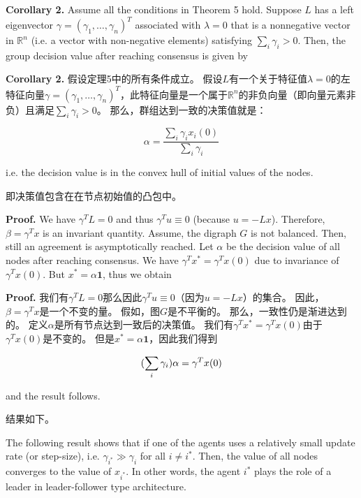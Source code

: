 \documentclass{article}
\begin{document}
{\color[gray]{0.5}
\noindent \textbf{Corollary 2.} Assume all the conditions in Theorem 5 hold. 
Suppose $L$ has a left eigenvector $\gamma = (\gamma_1, \dots, \gamma_n)^T$ associated with $\lambda=0$ that is a nonnegative vector in $\mathbb{R}^n$ (i.e. a vector with non-negative elements) satisfying $\sum_i\gamma_i>0$. 
Then, the group decision value after reaching consensus is given by
}

\noindent \textbf{Corollary 2.} 假设定理5中的所有条件成立。
假设$L$有一个关于特征值$\lambda=0$的左特征向量$\gamma = (\gamma_1, \dots, \gamma_n)^T$，此特征向量是一个属于$\mathbb{R}^n$的非负向量（即向量元素非负）且满足$\sum_i\gamma_i>0$。
那么，群组达到一致的决策值就是：

\begin{equation}
    \alpha = \frac{\sum_i \gamma_ix_i(0)}{\sum_i\gamma_i}
    \tag{19}
    \label{19}
\end{equation}

{\color[gray]{0.5}
\noindent i.e. the decision value is in the convex hull of initial values of the nodes.
}

\noindent 即决策值包含在在节点初始值的凸包中。

{\color[gray]{0.5}
\noindent \textbf{Proof.} We have $\gamma^TL=0$ and thus $\gamma^Tu\equiv0$ (because $u=-Lx$). 
Therefore, $\beta=\gamma^Tx$ is an invariant quantity. 
Assume, the digraph $G$ is not balanced. 
Then, still an agreement is asymptotically reached. 
Let $\alpha$ be the decision value of all nodes after reaching consensus. 
We have $\gamma^Tx^*=\gamma^Tx(0)$ due to invariance of $\gamma^Tx(0)$. 
But $x^*=\alpha\mathbf{1}$, thus we obtain
}

\noindent \textbf{Proof.} 
我们有$\gamma^TL=0$那么因此$\gamma^Tu\equiv0$（因为$u=-Lx$）的集合。
因此，$\beta=\gamma^Tx$是一个不变的量。
假如，图$G$是不平衡的。
那么，一致性仍是渐进达到的。
定义$\alpha$是所有节点达到一致后的决策值。
我们有$\gamma^Tx^*=\gamma^Tx(0)$由于$\gamma^Tx(0)$是不变的。
但是$x^*=\alpha\mathbf{1}$，因此我们得到

\begin{equation}
    (\sum_i\gamma_i)\alpha = \gamma^Tx(0)
    \notag
\end{equation}

{\color[gray]{0.5}
\noindent and the result follows.
}

\noindent 结果如下。

{\color[gray]{0.5}
The following result shows that if one of the agents uses a relatively small update rate (or step-size), i.e. $\gamma_{i^*}\gg\gamma_i$ for all $i\ne i^*$. 
Then, the value of all nodes converges to the value of $x_{i^*}$. 
In other words, the agent $i^*$ plays the role of a leader in leader-follower type architecture.
}
\end{document}
